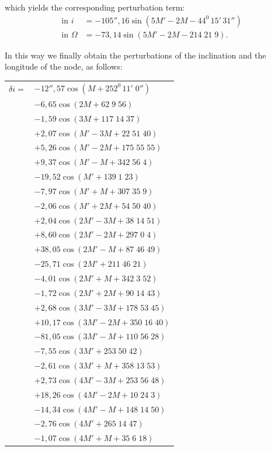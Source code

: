\endgroup
\noindent which yields the corresponding perturbation term:
\[
\begin{aligned}
\text{in }i&=-105''{,}16\sin(5M'-2M-44^0\,15'\,31'')\\
\text{in }\Omega&=-73{,}14\sin(5M'-2M-214\;21\;9).
\end{aligned}
\]
\par\noindent\hspace*{\parindent}In this way we finally obtain the perturbations of the inclination and the longitude of the node, as follows:
\begingroup
\renewcommand{\arraystretch}{1.15}
\begin{longtable}{@{}r@{}l@{}}
\(\delta i={}\)&\(-12''{,}57\cos(M+252^0\,11'\;0'')\)\\
&\(-6{,}65\cos(2M+62\;9\;56)\)\\
&\(-1{,}59\cos(3M+117\;14\;37)\)\\
&\(+2{,}07\cos(M'-3M+22\;51\;40)\)\\
&\(+5{,}26\cos(M'-2M+175\;55\;55)\)\\
&\(+9{,}37\cos(M'-M+342\;56\;4)\)\\
&\(-19{,}52\cos(M'+139\;1\;23)\)\\
&\(-7{,}97\cos(M'+M+307\;35\;9)\)\\
&\(-2{,}06\cos(M'+2M+54\;50\;40)\)\\
&\(+2{,}04\cos(2M'-3M+38\;14\;51)\)\\
&\(+8{,}60\cos(2M'-2M+297\;0\;4)\)\\
&\(+38{,}05\cos(2M'-M+87\;46\;49)\)\\
&\(-25{,}71\cos(2M'+211\;46\;21)\)\\
&\(-4{,}01\cos(2M'+M+342\;3\;52)\)\\
&\(-1{,}72\cos(2M'+2M+90\;14\;43)\)\\
&\(+2{,}68\cos(3M'-3M+178\;53\;45)\)\\
&\(+10{,}17\cos(3M'-2M+350\;16\;40)\)\\
&\(-81{,}05\cos(3M'-M+110\;56\;28)\)\\
&\(-7{,}55\cos(3M'+253\;50\;42)\)\\
&\(-2{,}61\cos(3M'+M+358\;13\;53)\)\\
&\(+2{,}73\cos(4M'-3M+253\;56\;48)\)\\
&\(+18{,}26\cos(4M'-2M+10\;24\;3)\)\\
&\(-14{,}34\cos(4M'-M+148\;14\;50)\)\\
&\(-2{,}76\cos(4M'+265\;14\;47)\)\\
&\(-1{,}07\cos(4M'+M+35\;6\;18)\)\\

\end{longtable}
